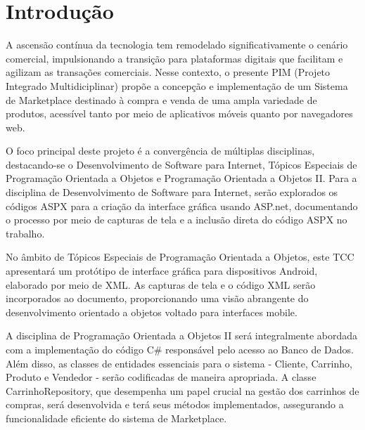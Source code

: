 \documentclass[
	12pt,				%
	openright,			%
	twoside,			%
	a4paper,			%
	english,			%
	brazil				%
	]{abntex2}
\begin{document}
\textual

\chapter{Introdução}

A ascensão contínua da tecnologia tem remodelado significativamente o cenário comercial, impulsionando a transição para plataformas digitais que facilitam e agilizam as transações comerciais. Nesse contexto, o presente PIM (Projeto Integrado Multidiciplinar) propõe a concepção e implementação de um Sistema de Marketplace destinado à compra e venda de uma ampla variedade de produtos, acessível tanto por meio de aplicativos móveis quanto por navegadores web.

O foco principal deste projeto é a convergência de múltiplas disciplinas, destacando-se o Desenvolvimento de Software para Internet, Tópicos Especiais de Programação Orientada a Objetos e Programação Orientada a Objetos II. Para a disciplina de Desenvolvimento de Software para Internet, serão explorados os códigos ASPX para a criação da interface gráfica usando ASP.net, documentando o processo por meio de capturas de tela e a inclusão direta do código ASPX no trabalho.

No âmbito de Tópicos Especiais de Programação Orientada a Objetos, este TCC apresentará um protótipo de interface gráfica para dispositivos Android, elaborado por meio de XML. As capturas de tela e o código XML serão incorporados ao documento, proporcionando uma visão abrangente do desenvolvimento orientado a objetos voltado para interfaces mobile.

A disciplina de Programação Orientada a Objetos II será integralmente abordada com a implementação do código C# responsável pelo acesso ao Banco de Dados. Além disso, as classes de entidades essenciais para o sistema - Cliente, Carrinho, Produto e Vendedor - serão codificadas de maneira apropriada. A classe CarrinhoRepository, que desempenha um papel crucial na gestão dos carrinhos de compras, será desenvolvida e terá seus métodos implementados, assegurando a funcionalidade eficiente do sistema de Marketplace.
\end{document}
